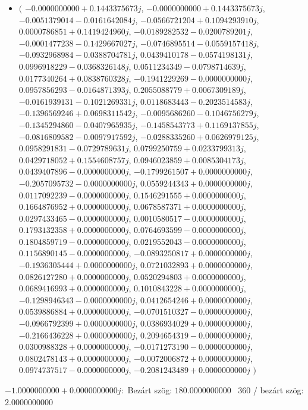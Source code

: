 \documentclass[14pt,a4paper]{article}
\begin{document}
\begin{itemize}
\item
$\big($
$-0.0000000000+0.1443375673j$, $-0.0000000000+0.1443375673j$, $-0.0051379014-0.0161642084j$, $-0.0566721204+0.1094293910j$, $0.0000786851+0.1419424960j$, $-0.0189282532-0.0200789201j$, $-0.0001477238-0.1429667027j$, $-0.0746895514-0.0559157418j$, $-0.0932968984-0.0388704781j$, $0.0439410178-0.0574198131j$, $0.0996918229-0.0368326148j$, $0.0511234349-0.0798714639j$, $0.0177340264+0.0838760328j$, $-0.1941229269-0.0000000000j$, $0.0957856293-0.0164871393j$, $0.2055088779+0.0067309189j$, $-0.0161939131-0.1021269331j$, $0.0118683443-0.2023514583j$, $-0.1396569246+0.0698311542j$, $-0.0095686260-0.1046756279j$, $-0.1345294860-0.0407965935j$, $-0.1458543773+0.1169137855j$, $-0.0816809582-0.0097917592j$, $-0.0288335260+0.0626979125j$, $0.0958291831-0.0729789631j$, $0.0799250759+0.0233799313j$, $0.0429718052+0.1554608757j$, $0.0946023859+0.0085304173j$, $0.0439407896-0.0000000000j$, $-0.1799261507+0.0000000000j$, $-0.2057095732-0.0000000000j$, $0.0559244343+0.0000000000j$, $0.0117092239-0.0000000000j$, $0.1546291555+0.0000000000j$, $0.1664876952+0.0000000000j$, $0.0678587371+0.0000000000j$, $0.0297433465-0.0000000000j$, $0.0010580517-0.0000000000j$, $0.1793132358+0.0000000000j$, $0.0764693599-0.0000000000j$, $0.1804859719-0.0000000000j$, $0.0219552043-0.0000000000j$, $0.1156890145-0.0000000000j$, $-0.0893250817+0.0000000000j$, $-0.1936305444+0.0000000000j$, $0.0721032893+0.0000000000j$, $0.0826127280+0.0000000000j$, $0.0520294803+0.0000000000j$, $0.0689416993+0.0000000000j$, $0.1010843228+0.0000000000j$, $-0.1298946343-0.0000000000j$, $0.0412654246+0.0000000000j$, $0.0539886884+0.0000000000j$, $-0.0701510327-0.0000000000j$, $-0.0966792399+0.0000000000j$, $0.0386934029+0.0000000000j$, $-0.2166436228+0.0000000000j$, $0.2094654319-0.0000000000j$, $0.0300988328+0.0000000000j$, $-0.0171273190-0.0000000000j$, $0.0802478143+0.0000000000j$, $-0.0072006872+0.0000000000j$, $0.0974737517-0.0000000000j$, $-0.2081243489+0.0000000000j$
$\big)$
\end{itemize}
$-1.0000000000+0.0000000000j$:\
Bezárt szög: $180.0000000000$ \
360 / bezárt szög: $2.0000000000$\
\end{document}
